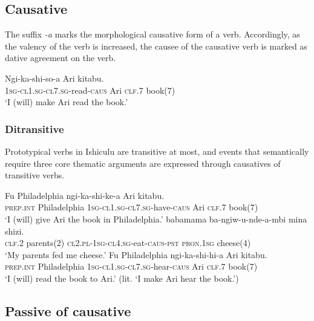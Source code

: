 \subsection{Causative}

The suffix \textit{-\textbeltl a} marks the morphological causative form of a verb. Accordingly, as the valency of the verb is increased, the causee of the causative verb is marked as dative agreement on the verb.

\begin{exe}
\ex
\gll Ngi-ka-shi-so-\textbeltl a Ari  kitabu. \\
\textsc{1sg}-\textsc{cl1.sg}-\textsc{cl7.sg}-read-\textsc{caus} Ari \textsc{clf}.7 book(7) \\
\trans `I (will) make Ari read the book.'
\end{exe}

\subsubsection{Ditransitive}

Prototypical verbs in Ishiculu are transitive at most, and events that semantically require three core thematic arguments are expressed through causatives of transitive verbs.

\begin{exe}
\ex
\gll Fu Philadelphia ngi-ka-shi-ke-\textbeltl a Ari  kitabu. \\
\textsc{prep.int} Philadelphia \textsc{1sg}-\textsc{cl1.sg}-\textsc{cl7.sg}-have-\textsc{caus} Ari \textsc{clf.7} book(7) \\
\trans `I (will) give Ari the book in Philadelphia.'
\ex
{} babamama ba-ngiw-u-nde-\textbeltl a-mbi mina shizi. \\
\textsc{clf.2} parents(2) \textsc{cl2.pl}-\textsc{1sg}-\textsc{cl4.sg}-eat-\textsc{caus}-\textsc{pst} \textsc{pron.1sg} cheese(4) \\
\trans `My parents fed me cheese.'
\ex
\gll Fu Philadelphia ngi-ka-shi-hi-\textbeltl a Ari  kitabu. \\
\textsc{prep.int} Philadelphia \textsc{1sg}-\textsc{cl1.sg}-\textsc{cl7.sg}-hear-\textsc{caus} Ari \textsc{clf.7} book(7) \\
\trans `I (will) read the book to Ari.' (lit. `I make Ari hear the book.')
\end{exe}

\subsection{Passive of causative}

